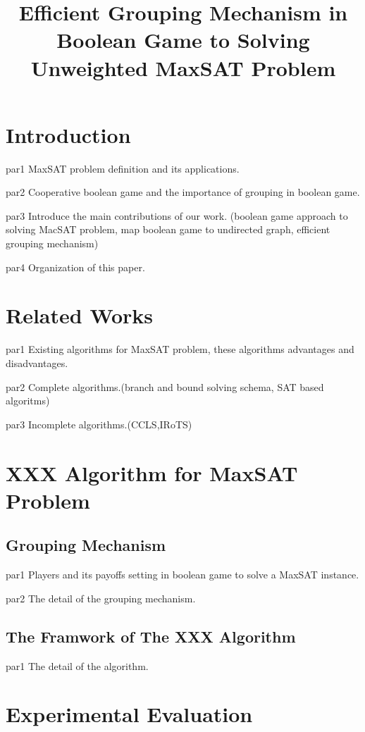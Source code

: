 \documentclass{llncs}
\begin{document}
\title{Efficient Grouping Mechanism in Boolean Game to Solving Unweighted MaxSAT Problem}
\maketitle
\begin{abstract}

\end{abstract}
\section{Introduction}
\par par1 MaxSAT problem definition and its applications.
\par par2 Cooperative boolean game and the importance of grouping in boolean game.
\par par3 Introduce the main contributions of our work. (boolean game approach to solving MacSAT problem, map boolean game to undirected graph, efficient grouping mechanism)
\par par4 Organization of this paper.
\section{Related Works}
\par par1 Existing algorithms for MaxSAT problem, these algorithms advantages and disadvantages.
\par par2 Complete algorithms.(branch and bound solving schema, SAT based algoritms)
\par par3 Incomplete algorithms.(CCLS,IRoTS)
\section{XXX Algorithm for MaxSAT Problem}
\subsection{Grouping Mechanism}
\par par1 Players and its payoffs setting in boolean game to solve a MaxSAT instance.
\par par2 The detail of the grouping mechanism.
\subsection{The Framwork of The XXX Algorithm}
\par par1 The detail of the algorithm. 
\section{Experimental Evaluation}
\end{document}
